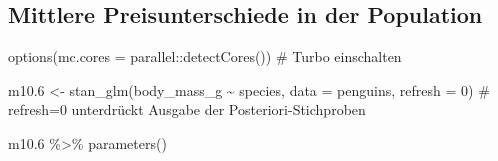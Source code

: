 \documentclass[
  a4paper,
  DIV=11]{scrreprt}
\newenvironment{Shaded}{\begin{snugshade}}{\end{snugshade}}
\newcommand{\AttributeTok}[1]{\textcolor[rgb]{0.40,0.45,0.13}{#1}}
\newcommand{\CommentTok}[1]{\textcolor[rgb]{0.37,0.37,0.37}{#1}}
\newcommand{\DecValTok}[1]{\textcolor[rgb]{0.68,0.00,0.00}{#1}}
\newcommand{\FloatTok}[1]{\textcolor[rgb]{0.68,0.00,0.00}{#1}}
\newcommand{\FunctionTok}[1]{\textcolor[rgb]{0.28,0.35,0.67}{#1}}
\newcommand{\NormalTok}[1]{\textcolor[rgb]{0.00,0.23,0.31}{#1}}
\newcommand{\OtherTok}[1]{\textcolor[rgb]{0.00,0.23,0.31}{#1}}
\newcommand{\SpecialCharTok}[1]{\textcolor[rgb]{0.37,0.37,0.37}{#1}}
\theoremstyle{definition}
\theoremstyle{remark}
\begin{document}
\hypertarget{mittlere-preisunterschiede-in-der-population}{%
\subsection{Mittlere Preisunterschiede in der
Population}\label{mittlere-preisunterschiede-in-der-population}}

\begin{Shaded}
\begin{Highlighting}[]
\FunctionTok{options}\NormalTok{(}\AttributeTok{mc.cores =}\NormalTok{ parallel}\SpecialCharTok{::}\FunctionTok{detectCores}\NormalTok{())  }\CommentTok{\# Turbo einschalten}

\NormalTok{m10}\FloatTok{.6} \OtherTok{\textless{}{-}} \FunctionTok{stan\_glm}\NormalTok{(body\_mass\_g }\SpecialCharTok{\textasciitilde{}}\NormalTok{ species, }\AttributeTok{data =}\NormalTok{ penguins, }\AttributeTok{refresh =} \DecValTok{0}\NormalTok{)}
\CommentTok{\# refresh=0 unterdrückt Ausgabe der Posteriori{-}Stichproben}
\end{Highlighting}
\end{Shaded}

\begin{Shaded}
\begin{Highlighting}[]
\NormalTok{m10}\FloatTok{.6} \SpecialCharTok{\%\textgreater{}\%} 
  \FunctionTok{parameters}\NormalTok{()}
\end{Highlighting}
\end{Shaded}
\end{document}
